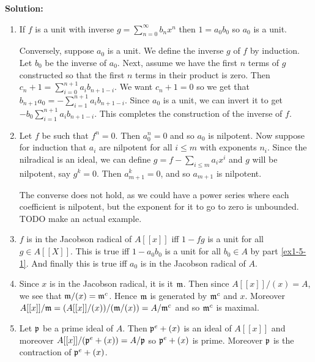\documentclass{article}
\begin{document}
\noindent\textbf{Solution:}
\begin{enumerate}
    \item
        If \(f\) is a unit with inverse \(g = \sum_{n=0}^\infty b_n x^n\) then \(1 = a_0 b_0\) so \(a_0\) is a unit.

        Conversely, suppose \(a_0\) is a unit.
        We define the inverse \(g\) of \(f\) by induction.
        Let \(b_0\) be the inverse of \(a_0\).
        Next, assume we have the first \(n\) terms of \(g\) constructed so that the first \(n\) terms in their product is zero.
        Then \(c_n+1 = \sum_{i=0}^{n+1} a_i b_{n+1-i}\).
        We want \(c_n+1 = 0\) so we get that \(b_{n+1} a_0 = -\sum_{i=1}^{n+1} a_i b_{n+1-i}\).
        Since \(a_0\) is a unit, we can invert it to get \(-b_0 \sum_{i=1}^{n+1} a_i b_{n+1-i}\).
        This completes the construction of the inverse of \(f\).
    \item
        Let \(f\) be such that \(f^n = 0\).
        Then \(a_0^n = 0\) and so \(a_0\) is nilpotent.
        Now suppose for induction that \(a_i\) are nilpotent for all \(i \leq m\) with exponents \(n_i\).
        Since the nilradical is an ideal, we can define \(g = f - \sum_{i \leq m} a_i x^i\) and \(g\) will be nilpotent, say \(g^k = 0\).
        Then \(a_{m+1}^k = 0\), and so \(a_{m+1}\) is nilpotent.

        The converse does not hold, as we could have a power series where each coefficient is nilpotent, but the exponent for it to go to zero is unbounded.
        TODO make an actual example.
    \item
        \(f\) is in the Jacobson radical of \(A[[x]]\) iff \(1 - fg\) is a unit for all \(g \in A[[X]]\).
        This is true iff \(1 - a_0 b_0\) is a unit for all \(b_0 \in A\) by part \ref{ex1-5-1}.
        And finally this is true iff \(a_0\) is in the Jacobson radical of \(A\).
    \item
        Since \(x\) is in the Jacobson radical, it is it \(\mathfrak{m}\).
        Then since \(A[[x]] / (x) = A\), we see that \(\mathfrak{m} / (x) = \mathfrak{m}^c\).
        Hence \(\mathfrak{m}\) is generated by \(\mathfrak{m}^c\) and \(x\).
        Moreover \(A[[x]]/\mathfrak{m} = (A[[x]]/(x))/(\mathfrak{m}/(x)) = A/\mathfrak{m}^c\) and so \(\mathfrak{m}^c\) is maximal.
    \item
        Let \(\mathfrak{p}\) be a prime ideal of \(A\).
        Then \(\mathfrak{p}^e + (x)\) is an ideal of \(A[[x]]\) and moreover \(A[[x]]/(\mathfrak{p}^e + (x)) = A/\mathfrak{p}\) so \(\mathfrak{p}^e + (x)\) is prime.
        Moreover \(\mathfrak{p}\) is the contraction of \(\mathfrak{p}^e + (x)\).
\end{enumerate}
\end{document}
